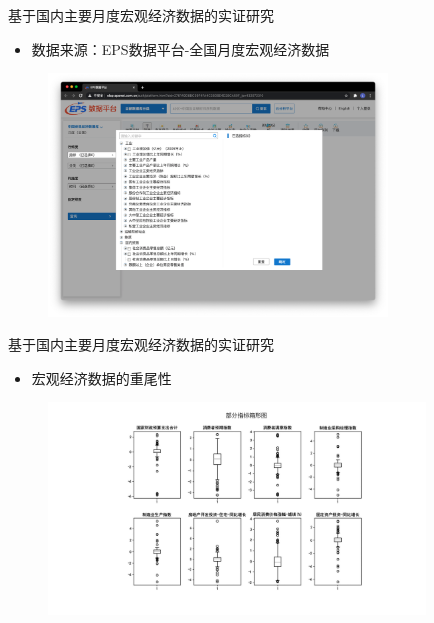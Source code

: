 \begin{frame}{基于国内主要月度宏观经济数据的实证研究}
    \begin{itemize}
        \item
        数据来源：EPS数据平台-全国月度宏观经济数据
    \end{itemize}
    \begin{figure}[H]
        \includegraphics[width=9cm]{pics/data-source.png}
    \end{figure}
\end{frame}

\begin{frame}{基于国内主要月度宏观经济数据的实证研究}
    \begin{itemize}
        \item
        宏观经济数据的重尾性
    \end{itemize}
    \begin{figure}[H]
        \includegraphics[width=10cm]{pics/box.pdf}
    \end{figure}
\end{frame}

